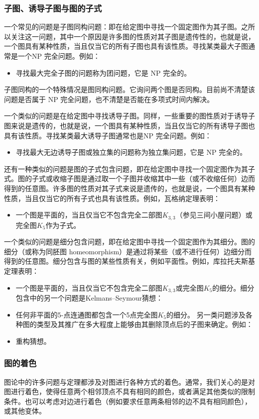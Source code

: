 \subsubsection{子图、诱导子图与图的子式}
一个常见的问题是子图同构问题：即在给定图中寻找一个固定图作为其子图。之所以关注这一问题，其中一个原因是许多图的性质对其子图是遗传性的，也就是说，一个图具有某种性质，当且仅当它的所有子图也具有该性质。寻找某类最大子图通常是一个NP 完全问题。例如：
\begin{itemize}
\item 寻找最大完全子图的问题称为团问题，它是 NP 完全的。
\end{itemize}
子图同构的一个特殊情况是图同构问题。它询问两个图是否同构。目前尚不清楚该问题是否属于 NP 完全问题，也不清楚是否能在多项式时间内解决。

一个类似的问题是在给定图中寻找诱导子图。同样，一些重要的图性质对于诱导子图来说是遗传的，也就是说，一个图具有某种性质，当且仅当它的所有诱导子图也具有该性质。寻找某类最大诱导子图通常也是NP 完全问题。例如：
\begin{itemize}
\item 寻找最大无边诱导子图或独立集的问题称为独立集问题，它是 NP 完全的。
\end{itemize}
还有一种类似的问题是图的子式包含问题，即在给定图中寻找一个固定图作为其子式。图的子式或收缩子图是通过取一个子图并收缩其中一些（或不收缩任何）边而得到的任意图。许多图的性质对其子式来说是遗传的，也就是说，一个图具有某种性质，当且仅当它的所有子式也具有该性质。例如，瓦格纳定理表明：
\begin{itemize}
\item 一个图是平面的，当且仅当它不包含完全二部图$K_{3,3}$（参见三间小屋问题）或完全图$K_{5}$作为子式。
\end{itemize}
一个类似的问题是细分包含问题，即在给定图中寻找一个固定图作为其细分。图的细分（或称为同胚图 homeomorphism）是通过将某些（或不进行任何）边细分而得到的任意图。细分包含与图的某些性质有关，例如平面性。例如，库拉托夫斯基定理表明：
\begin{itemize}
\item 一个图是平面的，当且仅当它不包含完全二部图$K_{3,3}$或完全图$K_{5}$的细分。细分包含中的另一个问题是Kelmans–Seymour猜想：
\item 任何非平面的5-点连通图都包含一个5点完全图$K_{5}$的细分。
另一类问题涉及各种图的类型及其推广在多大程度上能够由其删除顶点后的子图来确定。例如：
\item 重构猜想。
\end{itemize}
\subsubsection{图的着色}
图论中的许多问题与定理都涉及对图进行各种方式的着色。通常，我们关心的是对图进行着色，使得任意两个相邻顶点不具有相同的颜色，或者满足其他类似的限制条件。也可以考虑对边进行着色（例如要求任意两条相邻的边不具有相同颜色），或其他变体。

